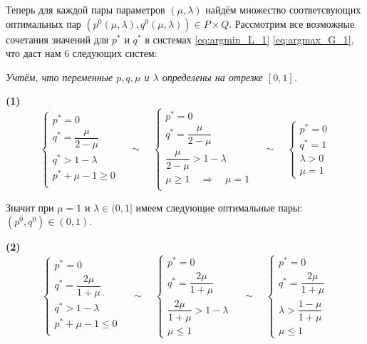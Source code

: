 
\hspace{5mm}

Теперь для каждой пары параметров $(\mu, \lambda)$ найдём множество
соответсвующих оптимальных пар 
$(p^0(\mu, \lambda), q^0(\mu, \lambda)) \in P \times Q$. 
Рассмотрим все возможные сочетания значений для $p^*$ и $q^*$ в системах 
\eqref{eq:argmin_L_1} \eqref{eq:argmax_G_1}, что даст нам 6 следующих систем:

\hspace{3mm}

	\textit{Учтём, что переменные $p, q, \mu$ и $\lambda$ определены на отрезке $[0, 1]$.}
	
\textbf{(1)}
$$
	\begin{cases}
		p^* = 0 \\
		q^* = \dfrac{\mu}{2 - \mu} \\
		q^* > 1 - \lambda \\
		p^* + \mu - 1 \geqslant 0 \\
	\end{cases}
	\quad \sim \quad
	\begin{cases}
		p^* = 0 \\
		q^* = \dfrac{\mu}{2 - \mu} \\
		\dfrac{\mu}{2 - \mu} > 1 - \lambda \\
		\mu \geqslant 1 \quad \Rightarrow \quad \mu = 1 \\
	\end{cases}
	\quad \sim \quad
	\begin{cases}
		p^* = 0 \\
		q^* = 1 \\
		\lambda > 0 \\
		\mu = 1
	\end{cases}
$$

Значит при $\mu = 1$  и $\lambda \in (0,1]$ имеем следующие оптимальные пары:
$(p^0, q^0) \in (0, 1)$.

\hspace{5mm}

\textbf{(2)}
$$
	\begin{cases}
		p^* = 0 \\
		q^* = \dfrac{2\mu}{1+\mu} \\
		q^* > 1 - \lambda \\
		p^* + \mu - 1 \leqslant 0 \\
	\end{cases}
	\quad \sim \quad
	\begin{cases}
		p^* = 0 \\
		q^* = \dfrac{2\mu}{1+\mu} \\
		\dfrac{2\mu}{1+\mu} > 1 - \lambda \\
		\mu \leqslant 1
	\end{cases}
	\quad \sim \quad
	\begin{cases}
		p^* = 0 \\
		q^* = \dfrac{2\mu}{1+\mu} \\
		\lambda > \dfrac{1-\mu}{1+\mu} \\
		\mu \leqslant 1
	\end{cases}
$$

